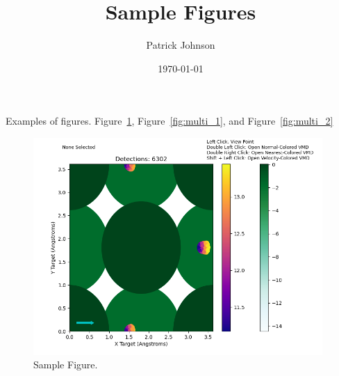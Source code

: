 \documentclass[12pt]{article}
\title{Sample Figures}
\author{Patrick Johnson}
\date{\today}
\begin{document}
\maketitle
\newpage

Examples of figures. Figure~\ref{fig:fig_1}, Figure~\ref{fig:multi_1}, and Figure~\ref{fig:multi_2}

\begin{figure}
    \centering
    \includegraphics[width=0.98\textwidth]{fig_1.png}
    \caption{Sample Figure.}
    \label{fig:fig_1}
\end{figure}
\end{document}
